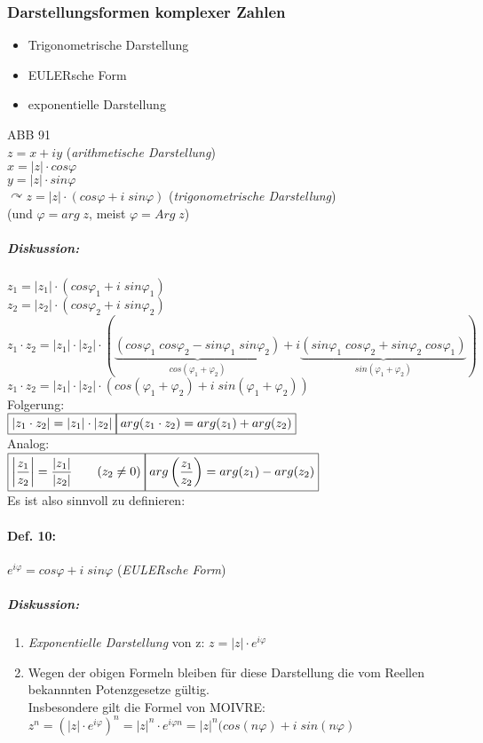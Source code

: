\subsubsection{Darstellungsformen komplexer Zahlen}
\begin{itemize}
\item Trigonometrische Darstellung
\item EULERsche Form
\item exponentielle Darstellung
\end{itemize}
ABB 91\\
$\boxed{z=x+iy}$ \qquad (\emph{arithmetische Darstellung})\\
$x=|z|\cdot cos \varphi$\\
$y=|z|\cdot sin \varphi$\\
$\curvearrowright \boxed{z=|z|\cdot (cos\varphi + i\; sin \varphi)}$ \qquad (\emph{trigonometrische Darstellung})\\
(und $\varphi=arg\; z$, meist $\varphi = Arg \; z$)
\subparagraph{Diskussion:} \parskp
$z_1= |z_1|\cdot (cos \varphi_1 + i \; sin \varphi_1)$\\
$z_2= |z_2|\cdot (cos \varphi_2 + i \; sin \varphi_2)$\medskip\\
$z_1 \cdot z_2 = |z_1| \cdot |z_2| \cdot ( \underbrace{(cos\varphi_1 \; cos \varphi_2 - sin\varphi_1 \; sin \varphi_2)}_{cos(\varphi_1+\varphi_2)}+i\underbrace{(sin \varphi_1 \; cos \varphi_2 + sin \varphi_2 \; cos \varphi_1)}_{sin(\varphi_1+\varphi_2)})$\\
$\boxed{z_1 \cdot z_2 = |z_1| \cdot |z_2| \cdot(cos (\varphi_1+\varphi_2)+i\; sin (\varphi_1+\varphi_2))}$\\
Folgerung:\\
$\boxed{|z_1\cdot z_2| = |z_1| \cdot |z_2|}\\
\boxed{arg(z_1\cdot z_2)=arg(z_1)+arg(z_2)}$\\
Analog:\\
$\boxed{\left|\frac{z_1}{z_2}\right| = \frac{|z_1|}{|z_2|} \qquad (z_2 \not = 0)} \\
\boxed{arg\left(\frac{z_1}{z_2}\right) = arg(z_1) - arg (z_2)}$\\
Es ist also sinnvoll zu definieren:
\paragraph{Def. 10:} \parskp
$\boxed{e^{i\varphi}=cos\varphi+i\; sin \varphi}$ \qquad (\emph{EULERsche Form})
\subparagraph{Diskussion:}
\begin{enumerate}
\item \emph{Exponentielle Darstellung} von z: $\boxed{z=|z|\cdot e^{i\varphi}}$
\item Wegen der obigen Formeln bleiben für diese Darstellung die vom Reellen bekannnten Potenzgesetze gültig.\\
Insbesondere gilt die Formel von MOIVRE: \\
$\boxed{z^n=\left(|z|\cdot e^{i\varphi}\right)^n=|z|^n\cdot e^{i\varphi n}=|z|^n(cos(n\varphi)+i\; sin (n \varphi)}$
\end{enumerate}

